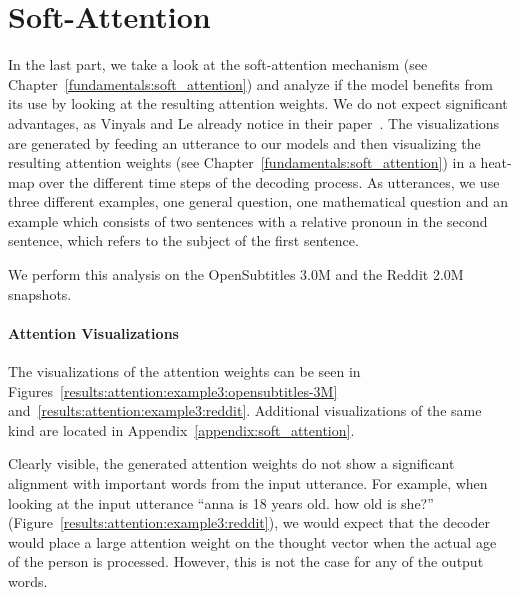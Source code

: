 \section{Soft-Attention}
\label{results:soft_attention}
In the last part, we take a look at the soft-attention mechanism (see Chapter~\ref{fundamentals:soft_attention}) and analyze if the model benefits from its use by looking at the resulting attention weights. We do not expect significant advantages, as Vinyals and Le already notice in their paper~\cite{Vinyals:2015}. The visualizations are generated by feeding an utterance to our models and then visualizing the resulting attention weights (see Chapter~\ref{fundamentals:soft_attention}) in a heat-map over the different time steps of the decoding process. As utterances, we use three different examples, one general question, one mathematical question and an example which consists of two sentences with a relative pronoun in the second sentence, which refers to the subject of the first sentence.

We perform this analysis on the OpenSubtitles 3.0M and the Reddit 2.0M snapshots.

\paragraph{Attention Visualizations} The visualizations of the attention weights can be seen in Figures~\ref{results:attention:example3:opensubtitles-3M} and~\ref{results:attention:example3:reddit}. Additional visualizations of the same kind are located in Appendix~\ref{appendix:soft_attention}.

Clearly visible, the generated attention weights do not show a significant alignment with important words from the input utterance. For example, when looking at the input utterance ``anna is 18 years old. how old is she?'' (Figure~\ref{results:attention:example3:reddit}), we would expect that the decoder would place a large attention weight on the thought vector when the actual age of the person is processed. However, this is not the case for any of the output words.

